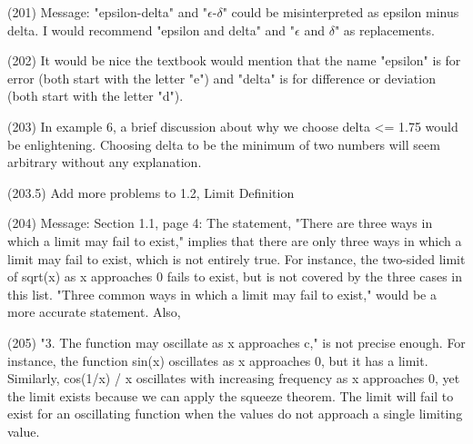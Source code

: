 {(201)  Message: "epsilon-delta" and "$\epsilon$-$\delta$" could be misinterpreted as epsilon minus delta. I would recommend "epsilon and delta" and "$\epsilon$ and $\delta$" as replacements.     
% 
  
(202)  It would be nice the textbook would mention that the name "epsilon" is for error (both start with the letter "e") and "delta" is for difference or deviation (both start with the letter "d"). 
      
(203)  In example 6, a brief discussion about why we choose delta <= 1.75 would be enlightening. Choosing delta to be the minimum of two numbers will seem arbitrary without any explanation.

(203.5) Add more problems to 1.2, Limit Definition

(204)  Message: Section 1.1, page 4: The statement, "There are three ways in which a limit may fail to exist," implies that there are only three ways in which a limit may fail to exist, which is not entirely true. For instance, the two-sided limit of sqrt(x) as x approaches 0 fails to exist, but is not covered by the three cases in this list. "Three common ways in which a limit may fail to exist," would be a more accurate statement. Also, 
  
(205)  "3. The function may oscillate as x approaches c," is not precise enough. For instance, the function sin(x) oscillates as x approaches 0, but it has a limit. Similarly, cos(1/x) / x oscillates with increasing frequency as x approaches 0, yet the limit exists because we can apply the squeeze theorem. The limit will fail to exist for an oscillating function when the values do not approach a single limiting value.

}
